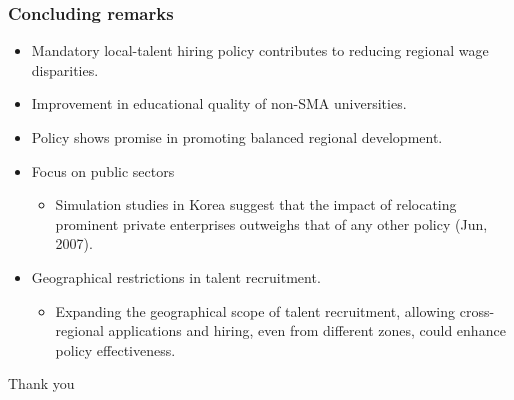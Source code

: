 \documentclass[aspectratio=169,xcolor=dvipsnames,handout]{beamer}
\begin{document}
\begin{frame}
    \frametitle{Concluding remarks}
    \begin{itemize}[<+->]
        \item Mandatory local-talent hiring policy contributes to reducing regional wage disparities.
        \item Improvement in educational quality of non-SMA universities.
        \item Policy shows promise in promoting balanced regional development.
        \item Focus on public sectors
        \begin{itemize}
            \item Simulation studies in Korea suggest that the impact of relocating prominent private enterprises outweighs that of any other policy (Jun, 2007). 
        \end{itemize}
        \item Geographical restrictions in talent recruitment.
        \begin{itemize}
            \item Expanding the geographical scope of talent recruitment, allowing cross-regional applications and hiring, even from different zones, could enhance policy effectiveness.
        \end{itemize}
    \end{itemize}
\end{frame}

\begin{frame}
    \centering
    \huge
    Thank you
\end{frame}


\end{document}
